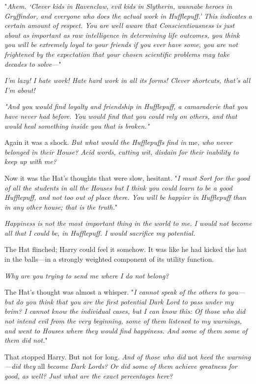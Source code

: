 "\emph{Ahem. `Clever kids in Ravenclaw, evil kids in Slytherin, wannabe heroes
in Gryffindor, and everyone who does the actual work in Hufflepuff.' This
indicates a certain amount of respect. You are well aware that
Conscientiousness is just about as important as raw intelligence in determining
life outcomes, you think you will be extremely loyal to your friends if you
ever have some, you are not frightened by the expectation that your chosen
scientific problems may take decades to solve}\mbox{---}"

\emph{I'm lazy! I hate work! Hate hard work in all its forms! Clever shortcuts,
that's all I'm about!}

\emph{"And you would find loyalty and friendship in Hufflepuff, a camaraderie
that you have never had before. You would find that you could rely on others,
and that would heal something inside you that is broken."}

Again it was a shock. \emph{But what would the Hufflepuffs find in} me\emph{,
who never belonged in their House? Acid words, cutting wit, disdain for their
inability to keep up with me?}

Now it was the Hat's thoughts that were slow, hesitant. "\emph{I must Sort for
the good of all the students in all the Houses{\el} but I think you could
learn to be a good Hufflepuff, and not too out of place there. You will be
happier in Hufflepuff than in any other house; that is the truth.}"

\emph{Happiness is not the most important thing in the world to me. I would not
become all that I could be, in Hufflepuff. I would sacrifice my potential.}

The Hat flinched; Harry could feel it somehow. It was like he had kicked the
hat in the balls---in a strongly weighted component of its utility function.

\emph{Why are you trying to send me where I do not belong?}

The Hat's thought was almost a whisper. "\emph{I cannot speak of the others to
you---but do you think that you are the first potential Dark Lord to pass under
my brim? I cannot know the individual cases, but I can know this: Of those who
did not intend evil from the very beginning, some of them listened to my
warnings, and went to Houses where they would find happiness. And some of
them{\el} some of them did not.}"

That stopped Harry. But not for long. \emph{And of those who did} not \emph{
heed the warning---did they} all \emph{become Dark Lords? Or did some of them
achieve greatness for good, as well? Just what are the exact percentages here?}

